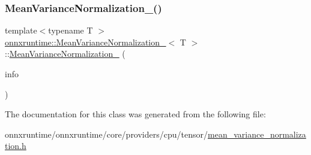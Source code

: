 \subsubsection{\texorpdfstring{Mean\+Variance\+Normalization\+\_()}{MeanVarianceNormalization\_1()}}
{\footnotesize\ttfamily template$<$typename T $>$ \\
\mbox{\hyperlink{classonnxruntime_1_1MeanVarianceNormalization__1}{onnxruntime\+::\+Mean\+Variance\+Normalization\+\_}}$<$ T $>$\+::\mbox{\hyperlink{classonnxruntime_1_1MeanVarianceNormalization__1}{Mean\+Variance\+Normalization\+\_}} (\begin{DoxyParamCaption}\item[{const \mbox{\hyperlink{classonnxruntime_1_1OpKernelInfo}{Op\+Kernel\+Info}} \&}]{info }\end{DoxyParamCaption})\hspace{0.3cm}{\ttfamily [inline]}}



The documentation for this class was generated from the following file\+:\begin{DoxyCompactItemize}
\item 
onnxruntime/onnxruntime/core/providers/cpu/tensor/\mbox{\hyperlink{mean__variance__normalization_8h}{mean\+\_\+variance\+\_\+normalization.\+h}}\end{DoxyCompactItemize}
